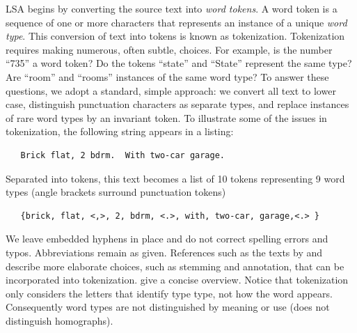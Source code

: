 \documentclass[10pt]{article}
\begin{document}
 LSA begins by converting the source text into {\em word tokens}.  A word token
 is a sequence of one or more characters that represents an instance of a unique
 {\em word type}.  This conversion of text into tokens is known as tokenization.
  Tokenization requires making numerous, often subtle, choices.  For example, is
 the number ``735'' a word token?  Do the tokens ``state'' and ``State''
 represent the same type?  Are ``room'' and ``rooms'' instances of the same word
 type?  To answer these questions, we adopt a standard, simple approach: we
 convert all text to lower case, distinguish punctuation characters as separate
 types, and replace instances of rare word types by an invariant token.  To
 illustrate some of the issues in tokenization, the following string appears in
 a listing:
 \begin{verbatim}
   Brick flat, 2 bdrm.  With two-car garage. \end{verbatim} 
 \noindent
 Separated into tokens, this text becomes a list of 10 tokens representing 9
 word types (angle brackets surround punctuation tokens)
 \begin{verbatim}
   {brick, flat, <,>, 2, bdrm, <.>, with, two-car, garage,<.> } \end{verbatim} 
 \noindent
 We leave embedded hyphens in place and do not correct spelling errors and
 typos.  Abbreviations remain as given.  References such as the texts by
 \citet{manning99} and \citet{jurafsky09} describe more elaborate choices, such
 as stemming and annotation, that can be incorporated into
 tokenization. \citet{turney10} give a concise overview.  Notice that
 tokenization only considers the letters that identify type type, not how the
 word appears.  Consequently word types are not distinguished by meaning or use
 (does not distinguish homographs).
\end{document}
